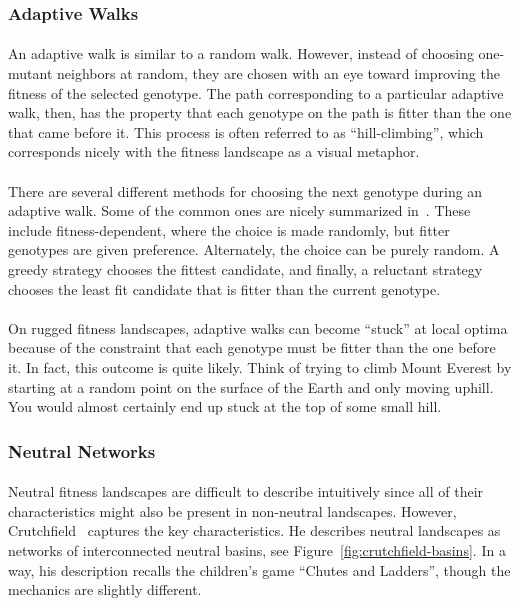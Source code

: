 \documentclass[12pt,letterpaper,titlepage]{article}
\begin{document}
\subsubsection{Adaptive Walks}

\paragraph{}
An adaptive walk is similar to a random walk. However, instead of choosing
one-mutant neighbors at random, they are chosen with an eye toward improving
the fitness of the selected genotype. The path corresponding to a particular
adaptive walk, then, has the property that each genotype on the path is fitter
than the one that came before it. This process is often referred to as
``hill-climbing'', which corresponds nicely with the fitness landscape as a
visual metaphor.

\paragraph{}
There are several different methods for choosing the next genotype during an
adaptive walk. Some of the common ones are nicely summarized
in~\cite{Nowak2015}. These include fitness-dependent, where the choice is made
randomly, but fitter genotypes are given preference. Alternately, the choice
can be purely random. A greedy strategy chooses the fittest candidate, and
finally, a reluctant strategy chooses the least fit candidate that is fitter
than the current genotype.

\paragraph{}
On rugged fitness landscapes, adaptive walks can become ``stuck'' at local
optima because of the constraint that each genotype must be fitter than the one
before it. In fact, this outcome is quite likely. Think of trying to climb
Mount Everest by starting at a random point on the surface of the Earth and
only moving uphill. You would almost certainly end up stuck at the top of some
small hill.

\subsubsection{Neutral Networks}

\paragraph{}
Neutral fitness landscapes are difficult to describe intuitively since all of
their characteristics might also be present in non-neutral landscapes. However,
Crutchfield~\cite{Crutchfield1999} captures the key characteristics. He
describes neutral landscapes as networks of interconnected neutral basins,
see Figure~\ref{fig:crutchfield-basins}. In a way, his description recalls the children's
game ``Chutes and Ladders'', though the mechanics are slightly different.
\end{document}
